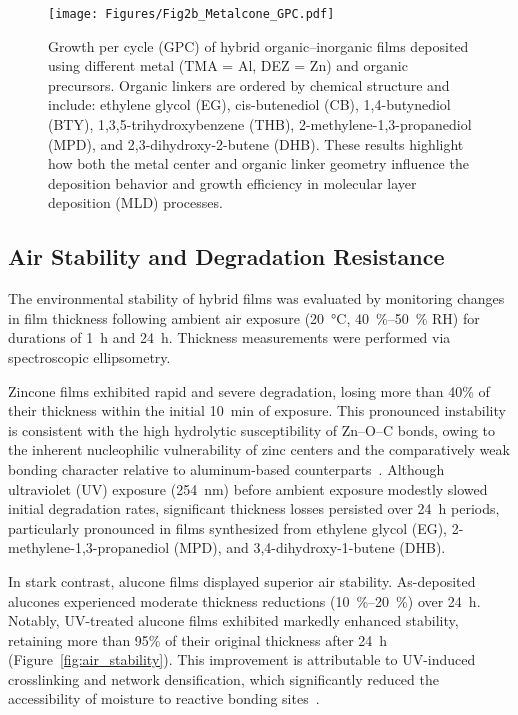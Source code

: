 \begin{figure}[H]
  \centering
  \texttt{[image: Figures/Fig2b\_Metalcone\_GPC.pdf]}
  \caption{
    Growth per cycle (GPC) of hybrid organic–inorganic films deposited using different metal (TMA = Al, DEZ = Zn) and organic precursors.
    Organic linkers are ordered by chemical structure and include: 
    ethylene glycol (EG), 
    cis-butenediol (CB), 
    1,4-butynediol (BTY), 
    1,3,5-trihydroxybenzene (THB), 
    2-methylene-1,3-propanediol (MPD), 
    and 2,3-dihydroxy-2-butene (DHB).
    These results highlight how both the metal center and organic linker geometry influence the deposition behavior and growth efficiency in molecular layer deposition (MLD) processes.
  }
  \label{fig:growth_gpc}
\end{figure}






\subsection{Air Stability and Degradation Resistance}

The environmental stability of hybrid films was evaluated by monitoring changes in film thickness following ambient air exposure (\SI{20}{\celsius}, \SIrange{40}{50}{\percent} RH) for durations of \SI{1}{\hour} and \SI{24}{\hour}. Thickness measurements were performed via spectroscopic ellipsometry.

Zincone films exhibited rapid and severe degradation, losing more than 40\% of their thickness within the initial \SI{10}{\minute} of exposure. This pronounced instability is consistent with the high hydrolytic susceptibility of Zn--O--C bonds, owing to the inherent nucleophilic vulnerability of zinc centers and the comparatively weak bonding character relative to aluminum-based counterparts~\cite{Nguyen2023}. Although ultraviolet (UV) exposure (\SI{254}{\nano\meter}) before ambient exposure modestly slowed initial degradation rates, significant thickness losses persisted over \SI{24}{\hour} periods, particularly pronounced in films synthesized from ethylene glycol (EG), 2-methylene-1,3-propanediol (MPD), and 3,4-dihydroxy-1-butene (DHB).

In stark contrast, alucone films displayed superior air stability. As-deposited alucones experienced moderate thickness reductions (\SIrange{10}{20}{\percent}) over \SI{24}{\hour}. Notably, UV-treated alucone films exhibited markedly enhanced stability, retaining more than 95\% of their original thickness after \SI{24}{\hour} (Figure~\ref{fig:air_stability}). This improvement is attributable to UV-induced crosslinking and network densification, which significantly reduced the accessibility of moisture to reactive bonding sites~\cite{Park2025}.

